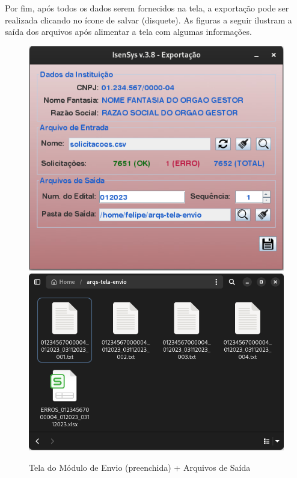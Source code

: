 \documentclass[
	12pt,			%
	openright,		%
	oneside,	
	a4paper,		%
	english,		%
	brazil			%
]{abntex2/abntex2}  %
\begin{document}
				Por fim, após todos os dados serem fornecidos na tela, a exportação pode ser realizada clicando no ícone de salvar (disquete). As figuras a seguir ilustram a saída dos arquivos após alimentar a tela com algumas informações.

				\clearpage
				\begin{figure}[ht]
					\begin{center}
						
						\caption{Tela do Módulo de Envio (preenchida) + Arquivos de Saída}
						
						\includegraphics[scale=0.4]{img/envio-ui-processed}
						\includegraphics[scale=0.3]{img/envio-files}
						
					\end{center}
				\end{figure}
\end{document}
